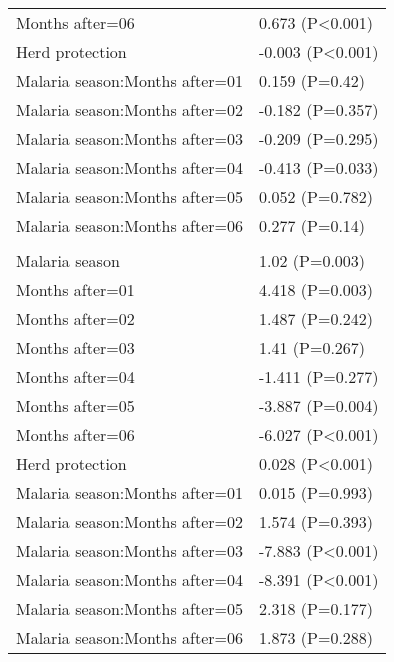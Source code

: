 \documentclass[]{article}
\begin{document}
\begin{longtable}[t]{ll}
\hspace{1em}Months after=06 & 0.673 (P<0.001)\\
\hspace{1em}Herd protection & -0.003 (P<0.001)\\
\hspace{1em}Malaria season:Months after=01 & 0.159 (P=0.42)\\
\hspace{1em}Malaria season:Months after=02 & -0.182 (P=0.357)\\
\hspace{1em}Malaria season:Months after=03 & -0.209 (P=0.295)\\
\hspace{1em}Malaria season:Months after=04 & -0.413 (P=0.033)\\
\hspace{1em}Malaria season:Months after=05 & 0.052 (P=0.782)\\
\hspace{1em}Malaria season:Months after=06 & 0.277 (P=0.14)\\
\addlinespace[1.5em]
\multicolumn{2}{l}{\textbf{Temporary not field worker}}\\
\hspace{1em}Malaria season & 1.02 (P=0.003)\\
\hspace{1em}Months after=01 & 4.418 (P=0.003)\\
\hspace{1em}Months after=02 & 1.487 (P=0.242)\\
\hspace{1em}Months after=03 & 1.41 (P=0.267)\\
\hspace{1em}Months after=04 & -1.411 (P=0.277)\\
\hspace{1em}Months after=05 & -3.887 (P=0.004)\\
\hspace{1em}Months after=06 & -6.027 (P<0.001)\\
\hspace{1em}Herd protection & 0.028 (P<0.001)\\
\hspace{1em}Malaria season:Months after=01 & 0.015 (P=0.993)\\
\hspace{1em}Malaria season:Months after=02 & 1.574 (P=0.393)\\
\hspace{1em}Malaria season:Months after=03 & -7.883 (P<0.001)\\
\hspace{1em}Malaria season:Months after=04 & -8.391 (P<0.001)\\
\hspace{1em}Malaria season:Months after=05 & 2.318 (P=0.177)\\
\hspace{1em}Malaria season:Months after=06 & 1.873 (P=0.288)\\*
\end{longtable}
\end{document}
